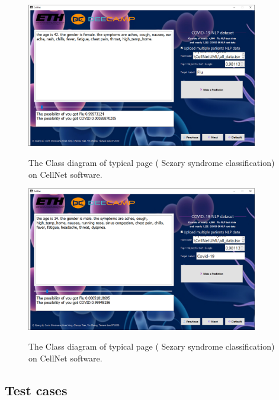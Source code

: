 \begin{figure}[t]
\begin{center}
\includegraphics[height=0.35\textheight,width=0.9\textwidth]{thesis-template-master/images/cellnet7-2page.PNG}
\label{fig:cellnet}
\end{center}
\caption{ The Class diagram of typical page ( Sezary syndrome classification) on CellNet software.}
\end{figure}


\begin{figure}[t]
\begin{center}
\includegraphics[height=0.35\textheight,width=0.9\textwidth]{thesis-template-master/images/cellnet7-3page.PNG}
\label{fig:cellnet}
\end{center}
\caption{ The Class diagram of typical page ( Sezary syndrome classification) on CellNet software. }
\end{figure}


\subsection{Test cases} %
\label{sub:amet}


